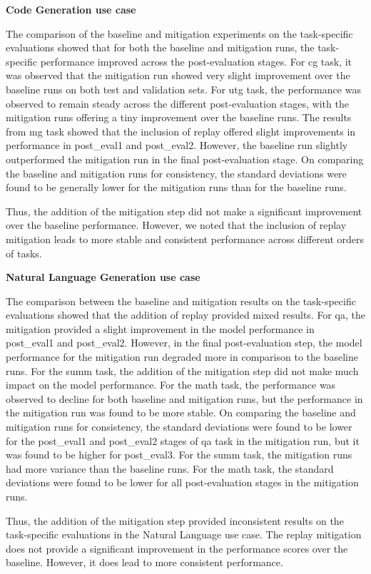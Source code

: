 \textbf{Code Generation use case}

The comparison of the baseline and mitigation experiments on the task-specific evaluations showed that for both the baseline and mitigation runs, the task-specific performance improved across the post-evaluation stages. For cg task, it was observed that the mitigation run showed very slight improvement over the baseline runs on both test and validation sets. For utg task, the performance was observed to remain steady across the different post-evaluation stages, with the mitigation runs offering a tiny improvement over the baseline runs. The results from mg task showed that the inclusion of replay offered slight improvements in performance in post\_eval1 and post\_eval2. However, the baseline run slightly outperformed the mitigation run in the final post-evaluation stage. 
On comparing the baseline and mitigation runs for consistency, the standard deviations were found to be generally lower for the mitigation runs than for the baseline runs.

Thus, the addition of the mitigation step did not make a significant improvement over the baseline performance. However, we noted that the inclusion of replay mitigation leads to more stable and consistent performance across different orders of tasks.

\textbf{Natural Language Generation use case}

The comparison between the baseline and mitigation results on the task-specific evaluations showed that the addition of replay provided mixed results. For qa, the mitigation provided a slight improvement in the model performance in post\_eval1 and post\_eval2. However, in the final post-evaluation step, the model performance for the mitigation run degraded more in comparison to the baseline runs. For the summ task, the addition of the mitigation step did not make much impact on the model performance. For the math task, the performance was observed to decline for both baseline and mitigation runs, but the performance in the mitigation run was found to be more stable. On comparing the baseline and mitigation runs for consistency, the standard deviations were found to be lower for the post\_eval1 and post\_eval2 stages of qa task in the mitigation run, but it was found to be higher for post\_eval3. For the summ task, the mitigation runs had more variance than the baseline runs. For the math task, the standard deviations were found to be lower for all post-evaluation stages in the mitigation runs.

Thus, the addition of the mitigation step provided inconsistent results on the task-specific evaluations in the Natural Language use case. The replay mitigation does not provide a significant improvement in the performance scores over the baseline. However, it does lead to more consistent performance.
